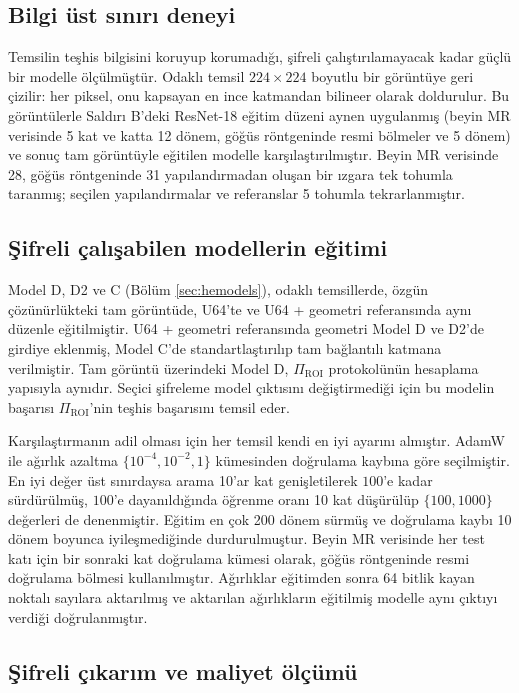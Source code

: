 \subsection{Bilgi üst sınırı deneyi}\label{sec:fov:info}

Temsilin teşhis bilgisini koruyup korumadığı, şifreli çalıştırılamayacak kadar güçlü bir modelle ölçülmüştür. Odaklı temsil $224 \times 224$ boyutlu bir görüntüye geri çizilir: her piksel, onu kapsayan en ince katmandan bilineer olarak doldurulur. Bu görüntülerle Saldırı B'deki ResNet-18 eğitim düzeni aynen uygulanmış (beyin MR verisinde 5 kat ve katta 12 dönem, göğüs röntgeninde resmi bölmeler ve 5 dönem) ve sonuç tam görüntüyle eğitilen modelle karşılaştırılmıştır. Beyin MR verisinde 28, göğüs röntgeninde 31 yapılandırmadan oluşan bir ızgara tek tohumla taranmış; seçilen yapılandırmalar ve referanslar 5 tohumla tekrarlanmıştır.

\subsection{Şifreli çalışabilen modellerin eğitimi}\label{sec:fov:models}

Model D, D2 ve C (Bölüm \ref{sec:hemodels}), odaklı temsillerde, özgün çözünürlükteki tam görüntüde, U64'te ve U64 + geometri referansında aynı düzenle eğitilmiştir. U64 + geometri referansında geometri Model D ve D2'de girdiye eklenmiş, Model C'de standartlaştırılıp tam bağlantılı katmana verilmiştir. Tam görüntü üzerindeki Model D, $\Pi_{\mathrm{ROI}}$ protokolünün hesaplama yapısıyla aynıdır. Seçici şifreleme model çıktısını değiştirmediği için bu modelin başarısı $\Pi_{\mathrm{ROI}}$'nin teşhis başarısını temsil eder.

Karşılaştırmanın adil olması için her temsil kendi en iyi ayarını almıştır. AdamW \cite{loshchilov2019adamw} ile ağırlık azaltma $\{10^{-4}, 10^{-2}, 1\}$ kümesinden doğrulama kaybına göre seçilmiştir. En iyi değer üst sınırdaysa arama 10'ar kat genişletilerek $100$'e kadar sürdürülmüş, $100$'e dayanıldığında öğrenme oranı 10 kat düşürülüp $\{100, 1000\}$ değerleri de denenmiştir. Eğitim en çok 200 dönem sürmüş ve doğrulama kaybı 10 dönem boyunca iyileşmediğinde durdurulmuştur. Beyin MR verisinde her test katı için bir sonraki kat doğrulama kümesi olarak, göğüs röntgeninde resmi doğrulama bölmesi kullanılmıştır. Ağırlıklar eğitimden sonra 64 bitlik kayan noktalı sayılara aktarılmış ve aktarılan ağırlıkların eğitilmiş modelle aynı çıktıyı verdiği doğrulanmıştır.

\subsection{Şifreli çıkarım ve maliyet ölçümü}\label{sec:fov:cost}

